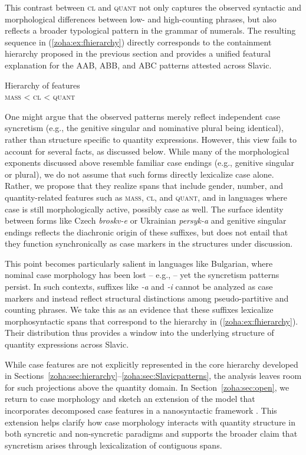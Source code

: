 \documentclass[output=paper,colorlinks,citecolor=brown
]{langscibook}
\begin{document}
This contrast between \textsc{cl} and \textsc{quant} not only captures the observed syntactic and morphological differences between low- and high-counting phrases, but also reflects a broader typological pattern in the grammar of numerals. The resulting sequence in (\ref{zoha:ex:fhierarchy}) directly corresponds to the containment hierarchy proposed in the previous section and provides a unified featural explanation for the AAB, ABB, and ABC patterns attested across Slavic.

\ea Hierarchy of features\label{zoha:ex:fhierarchy}\\
    \textsc{mass} < \textsc{cl} < \textsc{quant}
\z

\noindent One might argue that the observed patterns merely reflect independent case syncretism (e.g., the genitive singular and nominative plural being identical), rather than structure specific to quantity expressions. However, this view fails to account for several facts, as discussed below. While many of the morphological exponents discussed above resemble familiar case endings (e.g., genitive singular or plural), we do not assume that such forms directly lexicalize case alone. Rather, we propose that they realize spans that include gender, number, and quantity-related features such as \textsc{mass}, \textsc{cl}, and \textsc{quant}, and in languages where case is still morphologically active, possibly case as well. The surface identity between forms like Czech \textit{broskv-e} or Ukrainian \textit{persyk-a} and genitive singular endings reflects the diachronic origin of these suffixes, but does not entail that they function synchronically as case markers in the structures under discussion.

This point becomes particularly salient in languages like Bulgarian, where nominal case morphology has been lost -- e.g., \citet{Nicolova2017} -- yet the syncretism patterns persist. In such contexts, suffixes like \textit{-a} and \textit{-i} cannot be analyzed as case markers and instead reflect structural distinctions among pseudo-partitive and counting phrases. We take this as an evidence that these suffixes lexicalize morphosyntactic spans that correspond to the hierarchy in (\ref{zoha:ex:fhierarchy}). Their distribution thus provides a window into the underlying structure of quantity expressions across Slavic.

While case features are not explicitly represented in the core hierarchy developed in Sections~\ref{zoha:sec:hierarchy}--\ref{zoha:sec:Slavicpatterns}, the analysis leaves room for such projections above the quantity domain. In Section~\ref{zoha:sec:open}, we return to case morphology and sketch an extension of the model that incorporates decomposed case features in a nanosyntactic framework \citep{Caha2009}. This extension helps clarify how case morphology interacts with quantity structure in both syncretic and non-syncretic paradigms and supports the broader claim that syncretism arises through lexicalization of contiguous spans.
\end{document}
